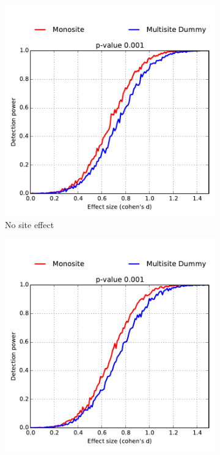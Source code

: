 \documentclass[authoryear]{elsarticle}
\begin{document}
\begin{figure}
        \centering
        \begin{subfigure}[b]{0.475\textwidth}
            \centering
            \includegraphics[width=\textwidth]{../figures/detect_pow_bal7030_var0_site0.pdf}
            {{\tiny No site effect}}    
            \label{fig:mean and std of net14}
        \end{subfigure}
        \hfill
        \begin{subfigure}[b]{0.475\textwidth}  
            \centering 
            \includegraphics[width=\textwidth]{../figures/detect_pow_bal7030_var0_site05.pdf}

\end{subfigure}
\end{figure}
\end{document}
